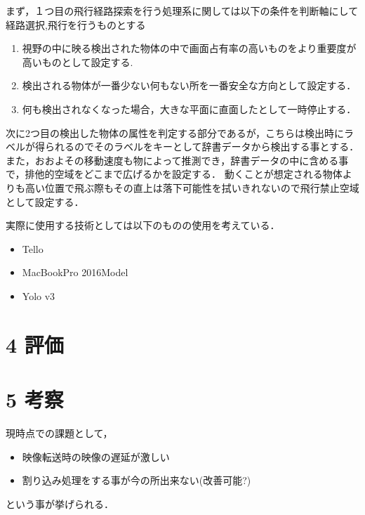 \documentclass[a4j,10pt]{jsarticle}
\begin{document}
まず，１つ目の飛行経路探索を行う処理系に関しては以下の条件を判断軸にして経路選択,飛行を行うものとする

\begin{enumerate}
\item 視野の中に映る検出された物体の中で画面占有率の高いものをより重要度が高いものとして設定する.
\item 検出される物体が一番少ない何もない所を一番安全な方向として設定する．
\item 何も検出されなくなった場合，大きな平面に直面したとして一時停止する．
\end{enumerate}

次に2つ目の検出した物体の属性を判定する部分であるが，こちらは検出時にラベルが得られるのでそのラベルをキーとして辞書データから検出する事とする．
また，おおよその移動速度も物によって推測でき，辞書データの中に含める事で，排他的空域をどこまで広げるかを設定する．
動くことが想定される物体よりも高い位置で飛ぶ際もその直上は落下可能性を拭いきれないので飛行禁止空域として設定する．

実際に使用する技術としては以下のものの使用を考えている．
\begin{itemize}
\item Tello
\item MacBookPro 2016Model
\item Yolo v3
\end{itemize}


\section{4 評価}

\section{5 考察}
現時点での課題として，
\begin{itemize}
\item 映像転送時の映像の遅延が激しい
\item 割り込み処理をする事が今の所出来ない(改善可能?) 
\end{itemize}
という事が挙げられる．
\end{document}
